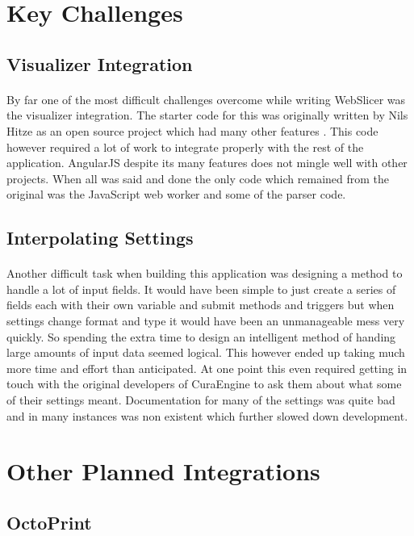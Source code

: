 \section{Key Challenges}
\subsection{Visualizer Integration}
\paragraph{}
By far one of the most difficult challenges overcome while writing WebSlicer was the visualizer integration.
The starter code for this was originally written by Nils Hitze as an open source project which had many other features \citet{hitzeViewer-2015}.
This code however required a lot of work to integrate properly with the rest of the application.
AngularJS despite its many features does not mingle well with other projects.
When all was said and done the only code which remained from the original was the JavaScript web worker and some of the parser code.

\subsection{Interpolating Settings}
\paragraph{}
Another difficult task when building this application was designing a method to handle a lot of input fields.
It would have been simple to just create a series of fields each with their own variable and submit methods and triggers but when settings change format and type it would have been an unmanageable mess very quickly.
So spending the extra time to design an intelligent method of handing large amounts of input data seemed logical.
This however ended up taking much more time and effort than anticipated.
At one point this even required getting in touch with the original developers of CuraEngine to ask them about what some of their settings meant.
Documentation for many of the settings was quite bad and in many instances was non existent which further slowed down development.

\section{Other Planned Integrations}
\subsection{OctoPrint}
